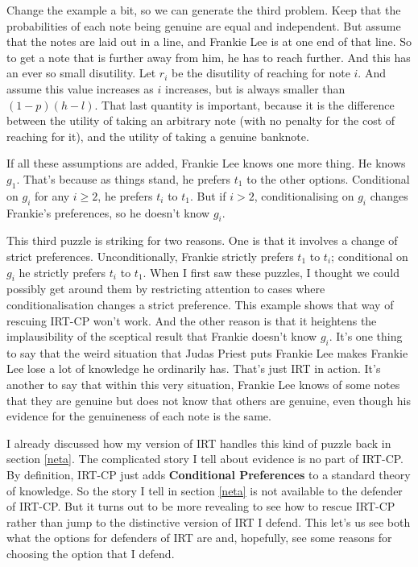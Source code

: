 \documentclass[11pt,]{book}
\begin{document}
Change the example a bit, so we can generate the third problem. Keep that the probabilities of each note being genuine are equal and independent. But assume that the notes are laid out in a line, and Frankie Lee is at one end of that line. So to get a note that is further away from him, he has to reach further. And this has an ever so small disutility. Let \(r_i\) be the disutility of reaching for note \(i\). And assume this value increases as \(i\) increases, but is always smaller than \((1-p)(h-l)\). That last quantity is important, because it is the difference between the utility of taking an arbitrary note (with no penalty for the cost of reaching for it), and the utility of taking a genuine banknote.

If all these assumptions are added, Frankie Lee knows one more thing. He knows \(g_1\). That's because as things stand, he prefers \(t_1\) to the other options. Conditional on \(g_i\) for any \(i \geq 2\), he prefers \(t_i\) to \(t_1\). But if \(i > 2\), conditionalising on \(g_i\) changes Frankie's preferences, so he doesn't know \(g_i\).

This third puzzle is striking for two reasons. One is that it involves a change of strict preferences. Unconditionally, Frankie strictly prefers \(t_1\) to \(t_i\); conditional on \(g_i\) he strictly prefers \(t_i\) to \(t_1\). When I first saw these puzzles, I thought we could possibly get around them by restricting attention to cases where conditionalisation changes a strict preference. This example shows that way of rescuing IRT-CP won't work. And the other reason is that it heightens the implausibility of the sceptical result that Frankie doesn't know \(g_i\). It's one thing to say that the weird situation that Judas Priest puts Frankie Lee makes Frankie Lee lose a lot of knowledge he ordinarily has. That's just IRT in action. It's another to say that within this very situation, Frankie Lee knows of some notes that they are genuine but does not know that others are genuine, even though his evidence for the genuineness of each note is the same.

I already discussed how my version of IRT handles this kind of puzzle back in section \ref{neta}. The complicated story I tell about evidence is no part of IRT-CP. By definition, IRT-CP just adds \textbf{Conditional Preferences} to a standard theory of knowledge. So the story I tell in section \ref{neta} is not available to the defender of IRT-CP. But it turns out to be more revealing to see how to rescue IRT-CP rather than jump to the distinctive version of IRT I defend. This let's us see both what the options for defenders of IRT are and, hopefully, see some reasons for choosing the option that I defend.
\end{document}
